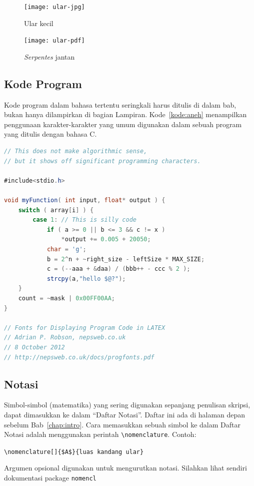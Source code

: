 \begin{figure}[H]
	\centering  
	\texttt{[image: ular-jpg]}  
	\caption[Ular kecil]{Ular kecil} 
	\label{fig:ularjpg} 
\end{figure} 

\begin{figure}[ht] 
	\centering  
	\texttt{[image: ular-pdf]}  
	\caption[ {\it Serpentes} betina]{ {\it Serpentes} jantan} 
	\label{fig:ularpdf} 
\end{figure} 
 
\subsection{Kode Program}

Kode program dalam bahasa tertentu seringkali harus ditulis di dalam bab, bukan hanya dilampirkan di bagian Lampiran. 
Kode~\ref{kode:aneh} menampilkan penggunaan karakter-karakter yang umum digunakan dalam sebuah program yang ditulis dengan bahasa C.


\begin{lstlisting}[language=Java, caption=Kode untuk menampilkan karakter-karakter aneh, label=kode:aneh]
// This does not make algorithmic sense, 
// but it shows off significant programming characters.

#include<stdio.h>

void myFunction( int input, float* output ) {
	switch ( array[i] ) {
		case 1: // This is silly code
			if ( a >= 0 || b <= 3 && c != x )
				*output += 0.005 + 20050;
			char = 'g';
			b = 2^n + ~right_size - leftSize * MAX_SIZE;
			c = (--aaa + &daa) / (bbb++ - ccc % 2 );
			strcpy(a,"hello $@?"); 
	}
	count = ~mask | 0x00FF00AA;
}

// Fonts for Displaying Program Code in LATEX
// Adrian P. Robson, nepsweb.co.uk
// 8 October 2012
// http://nepsweb.co.uk/docs/progfonts.pdf

\end{lstlisting}

\subsection{Notasi}

Simbol-simbol (matematika) yang sering digunakan sepanjang penulisan skripsi, dapat dimasukkan ke dalam ``Daftar Notasi''. Daftar ini ada di halaman depan sebelum Bab~\ref{chap:intro}.
Cara memasukkan sebuah simbol ke dalam Daftar Notasi adalah menggunakan perintah \verb|\nomenclature|. Contoh:
\begin{center}
    \verb|\nomenclature[]{$A$}{luas kandang ular}|    
\end{center}
Argumen opsional digunakan untuk mengurutkan notasi. Silahkan lihat sendiri dokumentasi package \verb|nomencl|

